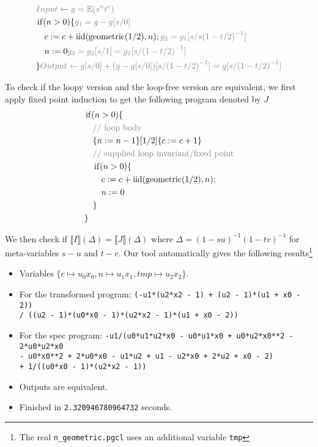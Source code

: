 \documentclass[a4paper]{article}
\DeclareMathOperator*{\iid}{iid}
\renewcommand{\S}[1]{ \llbracket #1 \rrbracket }
\newcommand{\E}{ \mathbb{E} }
\newcommand{\Geom}{\mathrm{geometric}}
\newcommand{\Anno}[1]{\color{gray}{#1}}
\begin{document}
\begin{align*}
	 & \Anno{Input \gets g = \E(s^n t^c)}                                                 \\
	 & \operatorname{if} (n>0) \{ \Anno{g_1 = g-g[s/0]}                                   \\
	 & \quad c := c + \iid(\Geom(1/2),n) ; \Anno{g_2 = g_1[s/s {(1-t/2)}^{-1}]}           \\
	 & \quad n := 0 \Anno{g_3 = g_2[s/1] = g_1[s/{(1-t/2)}^{-1}]}                         \\
	 & \} \Anno{Output \gets g[s/0] + (g-g[s/0])[s/{(1-t/2)}^{-1}] = g[s/{(1-t/2)}^{-1}]} \\
\end{align*}

To check if the loopy version and the loop-free version are equivalent,
we first apply fixed point induction to get the following program denoted by \(J\)
\begin{align*}
	 & \operatorname{if} (n > 0) \{                               \\
	 & \quad \Anno{\text{// loop body}}                           \\
	 & \quad \{n := n-1\}[1/2]\{c := c+1\}                        \\
	 & \quad \Anno{\text{// supplied loop invariant/fixed point}} \\
	 & \quad \operatorname{if} (n > 0) \{                         \\
	 & \qquad c := c + \iid(\Geom(1/2),n);                        \\
	 & \qquad n := 0                                              \\
	 & \quad \}                                                   \\
	 & \}                                                         \\
\end{align*}

We then check if \(\S{I}(\Delta)=\S{J}(\Delta)\) where \(\Delta = {(1-s u)}^{-1} {(1-t v)}^{-1}\) for meta-variables \(s-u\) and \(t-v\).
Our tool automatically gives the following results\footnote{The real \texttt{n\_geometric.pgcl} uses an additional variable \texttt{tmp}}

\begin{itemize}
	\item Variables \(\{c\mapsto u_0x_0, n\mapsto u_1x_1, tmp\mapsto u_2x_2\}\).
	\item For the transformed program:
	      \texttt{(-u1*(u2*x2 - 1) + (u2 - 1)*(u1 + x0 - 2)) \\ / ((u2 - 1)*(u0*x0 - 1)*(u2*x2 - 1)*(u1 + x0 - 2))}
	\item For the spec program:
	      \texttt{-u1/(u0*u1*u2*x0 - u0*u1*x0 + u0*u2*x0**2 - 2*u0*u2*x0 \\ - u0*x0**2 + 2*u0*x0 - u1*u2 + u1 - u2*x0 + 2*u2 + x0 - 2) \\ + 1/((u0*x0 - 1)*(u2*x2 - 1))}
	\item Outputs are equivalent.
	\item Finished in \texttt{2.320946780964732} seconds.
\end{itemize}
\end{document}
